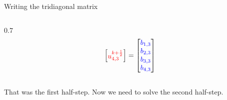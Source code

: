\documentclass{beamer}
\begin{document}
\begin{frame}{Writing the tridiagonal matrix}
\begin{columns}
\begin{column}{0.7\textwidth}
{\begin{align*}
\begin{bmatrix}
                        \textcolor{red}{u_{4,3}^{k+\frac{1}{2}}} \\
                    \end{bmatrix}
                    =
                    \begin{bmatrix}
                        \textcolor{blue}{b_{1,3}} \\
                        \textcolor{blue}{b_{2,3}} \\
                        \textcolor{blue}{b_{3,3}} \\
                        \textcolor{blue}{b_{4,3}} \\
                    \end{bmatrix}
                \end{align*}
                }
                \vspace{-1.5cm}
        \end{column}
    \end{columns}
   
    \vspace{0.1cm}
    \small
\end{frame}

\begin{frame}
That was the first half-step. Now we need to solve the second half-step.
\end{frame}
\end{document}
